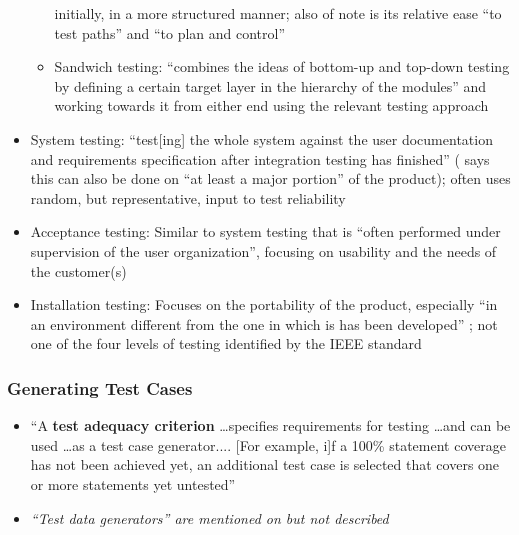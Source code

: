 \begin{itemize}
\begin{itemize}
{                              initially, in a more structured manner; also of
                              note is its relative ease ``to test paths'' and
                              ``to plan and control''
                              \cite[p.~490]{peters_software_2000}
                              }
                  \item Sandwich testing: ``combines the ideas of bottom-up and
                        top-down testing by defining a certain target layer in
                        the hierarchy of the modules'' and working towards it
                        from either end using the relevant testing approach
                        \cite[p.~491]{peters_software_2000}
            \end{itemize}
      \item System testing: ``test[ing] the whole system against the user
            documentation and requirements specification after integration
            testing has finished'' \cite[p.~439]{van_vliet_software_2000}
            (\cite[p.~109]{patton_software_2006} says this can also be done on
            ``at least a major portion'' of the product); often uses random,
            but representative, input to test reliability
            \cite[p.~439]{van_vliet_software_2000}
      \item Acceptance testing: Similar to system testing that is ``often
            performed under supervision of the user organization'',
            focusing on usability \cite[p.~439]{van_vliet_software_2000} and
            the needs of the customer(s) \cite[p.~492]{peters_software_2000}
      \item Installation testing: Focuses on the portability of the product,
            especially ``in an environment different from the one in which is
            has been developed'' \cite[p.~439]{van_vliet_software_2000}; not
            one of the four levels of testing identified by the IEEE standard
            \cite[p.~445]{peters_software_2000}
\end{itemize}

\subsubsection{Generating Test Cases}

\begin{itemize}
      \item ``A \textbf{test adequacy criterion} \dots specifies requirements
            for testing \dots and can be used \dots as a test case generator....
                  [For example, i]f a 100\% statement coverage has not been achieved
            yet, an additional test case is selected that covers one or more
            statements yet untested'' \cite[p.~402]{van_vliet_software_2000}
      \item \emph{``Test data generators'' are mentioned on
                  \cite[p.~410]{van_vliet_software_2000} but not described}
\end{itemize}

